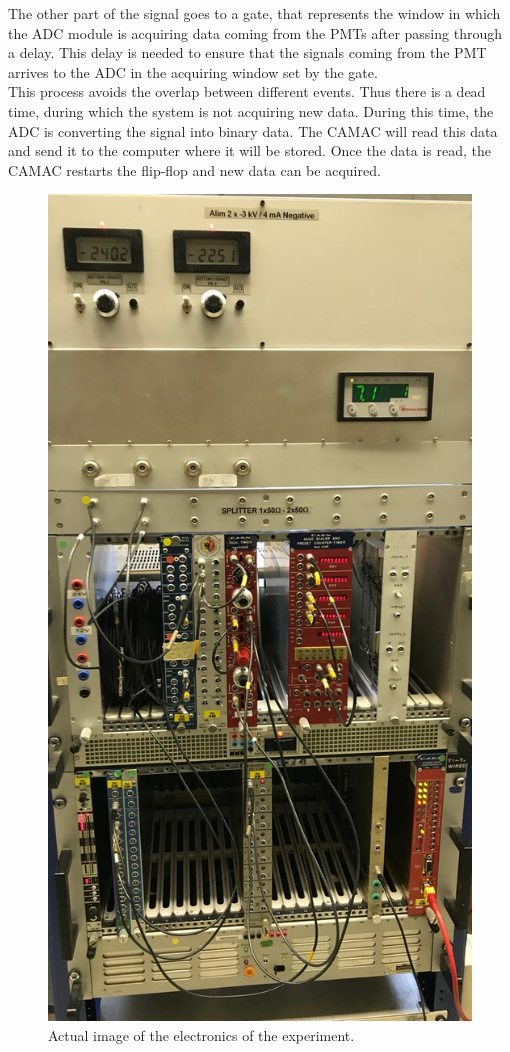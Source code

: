 \documentclass[10pt,swedish, openany]{book}
\begin{document}
The other part of the signal goes to a gate, that represents the window in which the ADC module is acquiring data coming from the PMTs after passing through a delay. This delay is needed to ensure that the signals coming from the PMT arrives to the ADC in the acquiring window set by the gate.\\

This process avoids the overlap between different events. Thus there is a dead time, during which the system is not acquiring new data. During this time, the ADC is converting the signal into binary data. The CAMAC will read this data and send it to the computer where it will be stored. Once the data is read, the CAMAC restarts the flip-flop and new data can be acquired.

\begin{figure}[H]
\includegraphics[scale=0.3]{electronics.jpeg}
\centering
\caption{Actual image of the electronics of the experiment.}
\label{fig:electronicsActual}
\end{figure}
\end{document}
